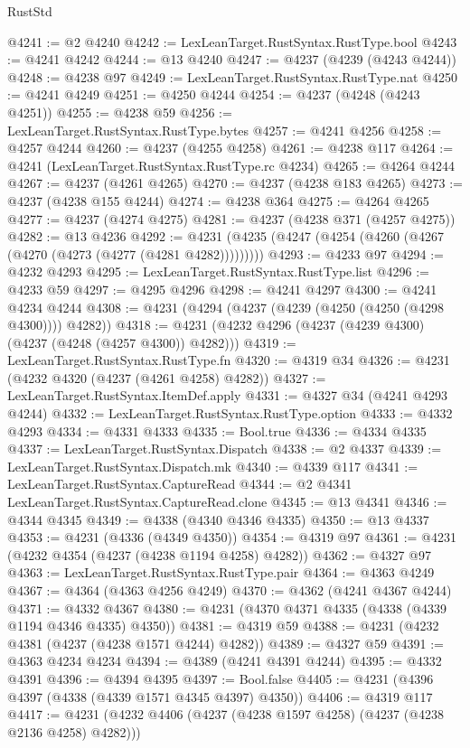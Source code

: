 \begin{lexlean}{RustStd}
\begin{coremodule}
{\begin{coremodule}
{{{{{{{{{{{{{{{{{{{{{{{{{{{{{{{{{{{{{{{{{{{{{{{{{{{{{{{@4241 := @2 @4240
@4242 := LexLeanTarget.RustSyntax.RustType.bool
@4243 := @4241 @4242
@4244 := @13 @4240
@4247 := @4237 (@4239 (@4243 @4244))
@4248 := @4238 @97
@4249 := LexLeanTarget.RustSyntax.RustType.nat
@4250 := @4241 @4249
@4251 := @4250 @4244
@4254 := @4237 (@4248 (@4243 @4251))
@4255 := @4238 @59
@4256 := LexLeanTarget.RustSyntax.RustType.bytes
@4257 := @4241 @4256
@4258 := @4257 @4244
@4260 := @4237 (@4255 @4258)
@4261 := @4238 @117
@4264 := @4241 (LexLeanTarget.RustSyntax.RustType.rc @4234)
@4265 := @4264 @4244
@4267 := @4237 (@4261 @4265)
@4270 := @4237 (@4238 @183 @4265)
@4273 := @4237 (@4238 @155 @4244)
@4274 := @4238 @364
@4275 := @4264 @4265
@4277 := @4237 (@4274 @4275)
@4281 := @4237 (@4238 @371 (@4257 @4275))
@4282 := @13 @4236
@4292 := @4231 (@4235 (@4247 (@4254 (@4260 (@4267 (@4270 (@4273 (@4277 (@4281 @4282)))))))))
@4293 := @4233 @97
@4294 := @4232 @4293
@4295 := LexLeanTarget.RustSyntax.RustType.list
@4296 := @4233 @59
@4297 := @4295 @4296
@4298 := @4241 @4297
@4300 := @4241 @4234 @4244
@4308 := @4231 (@4294 (@4237 (@4239 (@4250 (@4250 (@4298 @4300)))) @4282))
@4318 := @4231 (@4232 @4296 (@4237 (@4239 @4300) (@4237 (@4248 (@4257 @4300)) @4282)))
@4319 := LexLeanTarget.RustSyntax.RustType.fn
@4320 := @4319 @34
@4326 := @4231 (@4232 @4320 (@4237 (@4261 @4258) @4282))
@4327 := LexLeanTarget.RustSyntax.ItemDef.apply
@4331 := @4327 @34 (@4241 @4293 @4244)
@4332 := LexLeanTarget.RustSyntax.RustType.option
@4333 := @4332 @4293
@4334 := @4331 @4333
@4335 := Bool.true
@4336 := @4334 @4335
@4337 := LexLeanTarget.RustSyntax.Dispatch
@4338 := @2 @4337
@4339 := LexLeanTarget.RustSyntax.Dispatch.mk
@4340 := @4339 @117
@4341 := LexLeanTarget.RustSyntax.CaptureRead
@4344 := @2 @4341 LexLeanTarget.RustSyntax.CaptureRead.clone
@4345 := @13 @4341
@4346 := @4344 @4345
@4349 := @4338 (@4340 @4346 @4335)
@4350 := @13 @4337
@4353 := @4231 (@4336 (@4349 @4350))
@4354 := @4319 @97
@4361 := @4231 (@4232 @4354 (@4237 (@4238 @1194 @4258) @4282))
@4362 := @4327 @97
@4363 := LexLeanTarget.RustSyntax.RustType.pair
@4364 := @4363 @4249
@4367 := @4364 (@4363 @4256 @4249)
@4370 := @4362 (@4241 @4367 @4244)
@4371 := @4332 @4367
@4380 := @4231 (@4370 @4371 @4335 (@4338 (@4339 @1194 @4346 @4335) @4350))
@4381 := @4319 @59
@4388 := @4231 (@4232 @4381 (@4237 (@4238 @1571 @4244) @4282))
@4389 := @4327 @59
@4391 := @4363 @4234 @4234
@4394 := @4389 (@4241 @4391 @4244)
@4395 := @4332 @4391
@4396 := @4394 @4395
@4397 := Bool.false
@4405 := @4231 (@4396 @4397 (@4338 (@4339 @1571 @4345 @4397) @4350))
@4406 := @4319 @117
@4417 := @4231 (@4232 @4406 (@4237 (@4238 @1597 @4258) (@4237 (@4238 @2136 @4258) @4282)))
}}}}}}}}}}}}}}}}}}}}}}}}}}}}}}}}}}}}}}}}}}}}}}}}}}}}}}}
\end{coremodule}}
\end{coremodule}
\end{lexlean}
